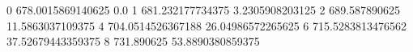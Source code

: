 0 678.0015869140625 0.0
1 681.232177734375 3.2305908203125
2 689.587890625 11.5863037109375
4 704.0514526367188 26.04986572265625
6 715.5283813476562 37.52679443359375
8 731.890625 53.8890380859375

